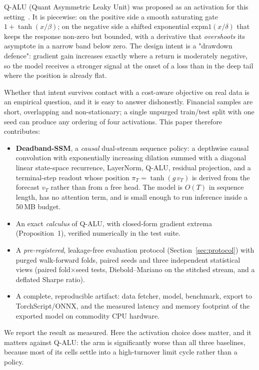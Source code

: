 \documentclass[conference]{IEEEtran}
\begin{document}
Q-ALU (Quant Asymmetric Leaky Unit) was proposed as an activation for this
setting~\cite{qalu}. It is piecewise: on the positive side a smooth saturating
gate $1+\tanh(x/\beta)$; on the negative side a shifted exponential
$\mathrm{expm1}(x/\delta)$ that keeps the response non-zero but bounded, with a
derivative that \emph{overshoots} its asymptote in a narrow band below zero.
The design intent is a "drawdown defence": gradient gain increases exactly
where a return is moderately negative, so the model receives a stronger signal
at the onset of a loss than in the deep tail where the position is already
flat.

Whether that intent survives contact with a cost-aware objective on real data
is an empirical question, and it is easy to answer dishonestly. Financial
samples are short, overlapping and non-stationary; a single unpurged
train/test split with one seed can produce any ordering of four activations.
This paper therefore contributes:

\begin{itemize}
\item \textbf{Deadband-SSM}, a \emph{causal} dual-stream sequence policy: a
depthwise causal convolution with exponentially increasing dilation summed with
a diagonal linear state-space recurrence, LayerNorm, Q-ALU, residual
projection, and a terminal-step readout whose position $\pi_T=\tanh(g\,v_T)$ is
derived from the forecast $v_T$ rather than from a free head. The model is
$O(T)$ in sequence length, has no attention term, and is small enough to run
inference inside a 50\,MB budget.
\item An exact \emph{calculus} of Q-ALU, with closed-form gradient extrema
(Proposition~1), verified numerically in the test suite.
\item A \emph{pre-registered}, leakage-free evaluation protocol
(Section~\ref{sec:protocol}) with purged walk-forward folds, paired seeds and
three independent statistical views (paired fold$\times$seed tests,
Diebold--Mariano on the stitched stream, and a deflated Sharpe ratio).
\item A complete, reproducible artifact: data fetcher, model, benchmark,
export to TorchScript/ONNX, and the measured latency and memory footprint of
the exported model on commodity CPU hardware.
\end{itemize}

We report the result as measured. Here the activation choice does matter, and it
matters against Q-ALU: the arm is significantly worse than all three baselines,
because most of its cells settle into a high-turnover limit cycle rather than a
policy.
\end{document}
